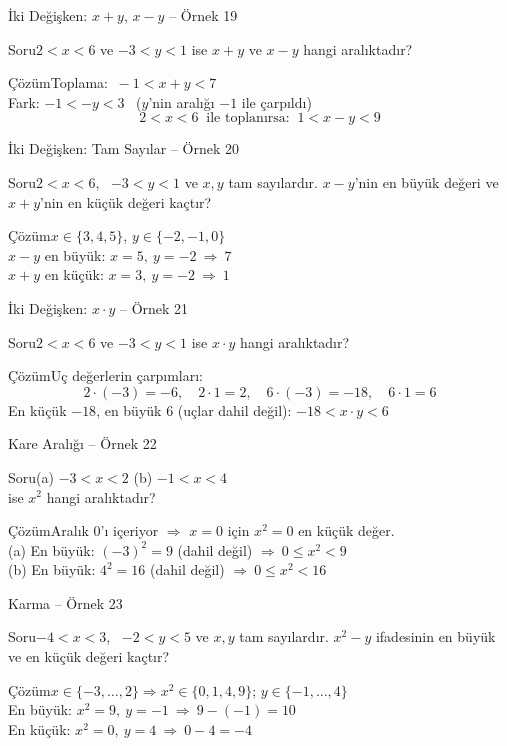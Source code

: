 \documentclass[aspectratio=169,11pt]{beamer}
\newcommand{\soru}[3]{%
\begin{frame}{#1}
  \begin{block}{Soru}\large #2\end{block}
  \pause
  \begin{exampleblock}{Çözüm}\large #3\end{exampleblock}
\end{frame}}
\begin{document}
\soru{İki Değişken: \(x+y\), \(x-y\) -- Örnek 19}
{\(2<x<6\) ve \(-3<y<1\) ise \(x+y\) ve \(x-y\) hangi aralıktadır?}
{Toplama: \(\ -1<x+y<7\)\\[4pt]
Fark: \(-1<-y<3\) \ (\(y\)'nin aralığı \(-1\) ile çarpıldı)
\[2<x<6\ \text{ ile toplanırsa: }\ 1<x-y<9\]}

\soru{İki Değişken: Tam Sayılar -- Örnek 20}
{\(2<x<6\), \ \(-3<y<1\) ve \(x,y\) tam sayılardır. \(x-y\)'nin en büyük değeri ve \(x+y\)'nin en küçük değeri kaçtır?}
{\(x\in\{3,4,5\}\), \quad \(y\in\{-2,-1,0\}\)\\[4pt]
\(x-y\) en büyük: \(x=5,\ y=-2\ \Rightarrow\ 7\)\\
\(x+y\) en küçük: \(x=3,\ y=-2\ \Rightarrow\ 1\)}

\soru{İki Değişken: \(x\cdot y\) -- Örnek 21}
{\(2<x<6\) ve \(-3<y<1\) ise \(x\cdot y\) hangi aralıktadır?}
{Uç değerlerin çarpımları:
\[2\cdot(-3)=-6,\quad 2\cdot 1=2,\quad 6\cdot(-3)=-18,\quad 6\cdot 1=6\]
En küçük \(-18\), en büyük \(6\) (uçlar dahil değil): \quad \(-18<x\cdot y<6\)}

\soru{Kare Aralığı -- Örnek 22}
{(a) \(-3<x<2\) \qquad (b) \(-1<x<4\)\\ ise \(x^2\) hangi aralıktadır?}
{Aralık \(0\)'ı içeriyor \(\Rightarrow\) \(x=0\) için \(x^2=0\) en küçük değer.\\[3pt]
(a) En büyük: \((-3)^2=9\) (dahil değil) \(\Rightarrow\ 0\le x^2<9\)\\
(b) En büyük: \(4^2=16\) (dahil değil) \(\Rightarrow\ 0\le x^2<16\)}

\soru{Karma -- Örnek 23}
{\(-4<x<3\), \ \(-2<y<5\) ve \(x,y\) tam sayılardır. \(x^2-y\) ifadesinin en büyük ve en küçük değeri kaçtır?}
{\(x\in\{-3,\dots,2\}\Rightarrow x^2\in\{0,1,4,9\}\); \quad \(y\in\{-1,\dots,4\}\)\\[4pt]
En büyük: \(x^2=9,\ y=-1\ \Rightarrow\ 9-(-1)=10\)\\
En küçük: \(x^2=0,\ y=4\ \Rightarrow\ 0-4=-4\)}
\end{document}
